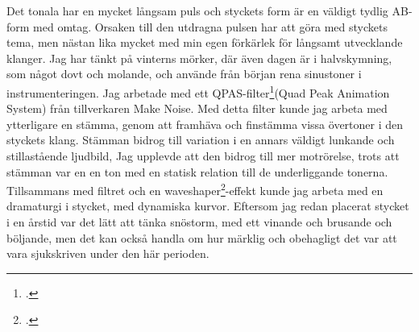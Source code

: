 \documentclass{article}
\begin{document}
Det tonala har en mycket långsam puls och styckets form är en väldigt tydlig AB-form med omtag. Orsaken till
den utdragna pulsen har att göra med styckets tema, men nästan lika mycket med min egen förkärlek för långsamt
utvecklande klanger. Jag har tänkt på vinterns mörker, där även dagen är i halvskymning, som något dovt och
molande, och använde från början rena sinustoner i instrumenteringen. Jag arbetade med ett
QPAS-filter\footcite{qpas}(Quad Peak Animation System) från
tillverkaren Make Noise. Med detta filter kunde jag arbeta med ytterligare en stämma, genom att framhäva och
finstämma vissa övertoner i den styckets klang. Stämman bidrog till variation i en annars väldigt lunkande och
stillastående ljudbild, Jag upplevde att den bidrog till mer motrörelse, trots att stämman var en en ton med
en statisk relation till de underliggande tonerna. Tillsammans med filtret och en
waveshaper\footcite{waveshaper}-effekt kunde jag arbeta med en dramaturgi i
stycket, med dynamiska kurvor. Eftersom jag redan placerat stycket i en årstid var det lätt att tänka
snöstorm, med ett vinande och brusande och böljande, men det kan också handla om hur märklig och obehagligt
det var att vara sjukskriven under den här perioden.


\end{document}
